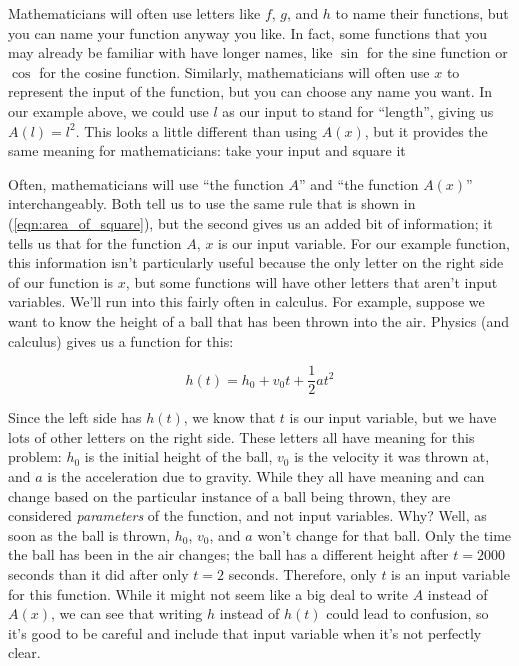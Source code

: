 Mathematicians will often use letters like $f$, $g$, and $h$ to name their functions, but you can name your function anyway you like. In fact, some functions that you may already be familiar with have longer names, like $\sin$ for the sine function or $\cos$ for the cosine function. Similarly, mathematicians will often use $x$ to represent the input of the function, but you can choose any name you want. In our example above, we could use $l$ as our input to stand for ``length'', giving us $A(l) = l^2$. This looks a little different than using $A(x)$, but it provides the same meaning for mathematicians: take your input and square it

Often, mathematicians will use ``the function $A$'' and ``the function $A(x)$'' interchangeably. Both tell us to use the same rule that is shown in (\ref{eqn:area_of_square}), but the second gives us an added bit of information; it tells us that for the function $A$, $x$ is our input variable. For our example function, this information isn't particularly useful because the only letter on the right side of our function is $x$, but some functions will have other letters that aren't input variables. We'll run into this fairly often in calculus. For example, suppose we want to know the height of a ball that has been thrown into the air. Physics (and calculus) gives us a function for this:

\begin{equation}\label{eqn:height_of_ball}
	h(t)=h_0+v_0 t +\frac{1}{2}a t^2
\end{equation}

Since the left side has $h(t)$, we know that $t$ is our input variable, but we have lots of other letters on the right side. These letters all have meaning for this problem: $h_0$ is the initial height of the ball, $v_0$ is the velocity it was thrown at, and $a$ is the acceleration due to gravity. While they all have meaning and can change based on the particular instance of a ball being thrown, they are considered \emph{parameters} of the function, and not input variables. Why? Well, as soon as the ball is thrown, $h_0$, $v_0$, and $a$ won't change for that ball. Only the time the ball has been in the air changes; the ball has a different height after $t=2000$ seconds than it did after only $t=2$ seconds. Therefore, only $t$ is an input variable for this function. While it might not seem like a big deal to write $A$ instead of $A(x)$, we can see that writing $h$ instead of $h(t)$ could lead to confusion, so it's good to be careful and include that input variable when it's not perfectly clear.


